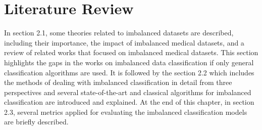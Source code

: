 \chapter{Literature Review}
In section 2.1, some theories related to imbalanced datasets are described, including their importance, the impact of imbalanced medical datasets, and a review of related works that focused on imbalanced medical datasets. This section highlights the gaps in the works on imbalanced data classification if only general classification algorithms are used. It is followed by the section 2.2 which includes the methods of dealing with imbalanced classification in detail from three perspectives and several state-of-the-art and classical algorithms for imbalanced classification are introduced and explained. At the end of this chapter, in section 2.3, several metrics applied for evaluating the imbalanced classification models are briefly described. 


